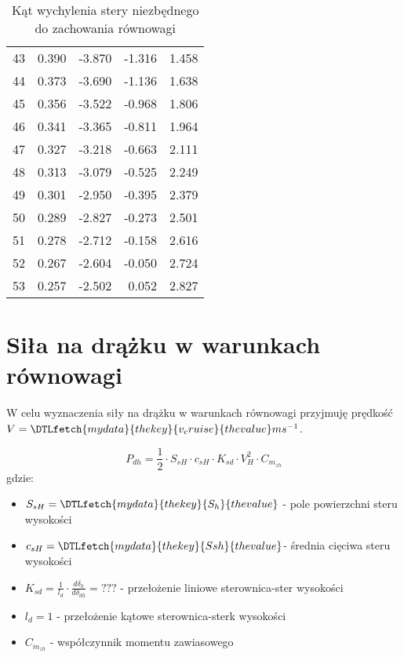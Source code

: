 \documentclass[12pt]{sprawozdanie}
\newcommand{\PlaneVar}[1]{\DTLfetch{mydata}{thekey}{#1}{thevalue}}
\begin{document}
\begin{table}[h!]
\begin{tabular}{rrrrr}
        43  &  0.390 &    -3.870 &    -1.316 &     1.458 \\
        44  &  0.373 &    -3.690 &    -1.136 &     1.638 \\
        45  &  0.356 &    -3.522 &    -0.968 &     1.806 \\
        46  &  0.341 &    -3.365 &    -0.811 &     1.964 \\
        47  &  0.327 &    -3.218 &    -0.663 &     2.111 \\
        48  &  0.313 &    -3.079 &    -0.525 &     2.249 \\
        49  &  0.301 &    -2.950 &    -0.395 &     2.379 \\
        50  &  0.289 &    -2.827 &    -0.273 &     2.501 \\
        51  &  0.278 &    -2.712 &    -0.158 &     2.616 \\
        52  &  0.267 &    -2.604 &    -0.050 &     2.724 \\
        53  &  0.257 &    -2.502 &     0.052 &     2.827 \\
        \bottomrule
        \end{tabular}
    \caption{Kąt wychylenia stery niezbędnego do zachowania równowagi}
    \label{tab:deltahv}        
\end{table}
\FloatBarrier


\section{Siła na drążku w warunkach równowagi}
W celu wyznaczenia siły na drążku w warunkach równowagi przyjmuję prędkość $V = \PlaneVar{v_cruise} ms^{-1}$.

\begin{equation}
    P_{dh} = \frac{1}{2}\cdot S_{sH}\cdot c_{sH} \cdot K_{sd} \cdot  V_H^2 \cdot C_{m_{zh}}
\end{equation}
gdzie:
\begin{itemize}
    \item $S_{sH} = \PlaneVar{S_h}$ - pole powierzchni steru wysokości
    \item $c_{sH} = \PlaneVar{Ssh}$- średnia cięciwa steru wysokości
    \item $K_{sd} = \frac{1}{l_d} \cdot \frac{d \delta_h}{d \delta_{dh}} = ???$ - przełożenie liniowe sterownica-ster wysokości
    \item $l_d = 1$ - przełożenie kątowe sterownica-sterk wysokości
    \item $C_{m_{zh}}$ - współczynnik momentu zawiasowego
\end{itemize}
\end{document}
